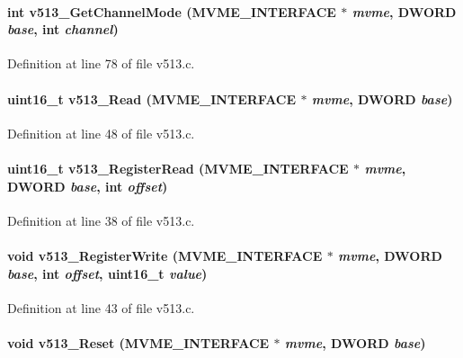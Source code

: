 \paragraph[{v513\_\-GetChannelMode}]{\setlength{\rightskip}{0pt plus 5cm}int v513\_\-GetChannelMode ({\bf MVME\_\-INTERFACE} $\ast$ {\em mvme}, \/  {\bf DWORD} {\em base}, \/  int {\em channel})}\hfill\label{v513_8h_a1a0c8a9ed02f747a1555d88719b4ff28}


Definition at line 78 of file v513.c.
\paragraph[{v513\_\-Read}]{\setlength{\rightskip}{0pt plus 5cm}uint16\_\-t v513\_\-Read ({\bf MVME\_\-INTERFACE} $\ast$ {\em mvme}, \/  {\bf DWORD} {\em base})}\hfill\label{v513_8h_a3852c38688f99443a74359b32e795196}


Definition at line 48 of file v513.c.
\paragraph[{v513\_\-RegisterRead}]{\setlength{\rightskip}{0pt plus 5cm}uint16\_\-t v513\_\-RegisterRead ({\bf MVME\_\-INTERFACE} $\ast$ {\em mvme}, \/  {\bf DWORD} {\em base}, \/  int {\em offset})}\hfill\label{v513_8h_aa3b74d0b3e46110157c2e1a794cd776e}


Definition at line 38 of file v513.c.
\paragraph[{v513\_\-RegisterWrite}]{\setlength{\rightskip}{0pt plus 5cm}void v513\_\-RegisterWrite ({\bf MVME\_\-INTERFACE} $\ast$ {\em mvme}, \/  {\bf DWORD} {\em base}, \/  int {\em offset}, \/  uint16\_\-t {\em value})}\hfill\label{v513_8h_a06b9ab73791fd1ce7a8fdf26a8a229dd}


Definition at line 43 of file v513.c.
\paragraph[{v513\_\-Reset}]{\setlength{\rightskip}{0pt plus 5cm}void v513\_\-Reset ({\bf MVME\_\-INTERFACE} $\ast$ {\em mvme}, \/  {\bf DWORD} {\em base})}\hfill\label{v513_8h_a0e4ce80f6a7cdc07e4aae15cd970b457}



